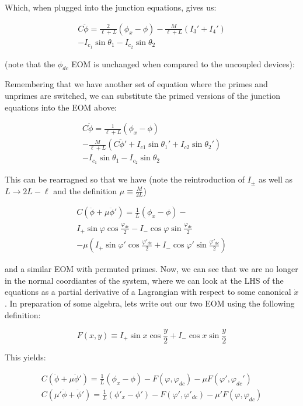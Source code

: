 \documentclass[paper=a4, twocolumn, fontsize=10pt]{article} %
\numberwithin{equation}{section} %
\numberwithin{figure}{section} %
\numberwithin{table}{section} %
\begin{document}
Which, when plugged into the junction equations, gives us:

\begin{multline}
    C \ddot{\phi} = \frac{2}{\ell+L}\left( \phi_x - \phi \right) - \frac{M}{\ell+L} (I_3'+I_4') \\ - I_{c_1} \sin \theta_1 - I_{c_2} \sin \theta_2
\end{multline}

(note that the $\phi_{dc}$ EOM is unchanged when compared to the uncoupled devices):

Remembering that we have another set of equation where the primes and unprimes are switched, we can substitute the primed versions of the junction equations into the EOM above:

\begin{multline}
    C \ddot{\phi} = \frac{1}{\ell+L}\left( \phi_x - \phi \right) \\ - \frac{M}{\ell+L} ( C\ddot{\phi}' + I_{c1}\sin \theta_1' + I_{c2} \sin \theta_2') \\ - I_{c_1} \sin \theta_1 - I_{c_2} \sin \theta_2
\end{multline}

This can be rearragned so that we have (note the reintroduction of $I_{\pm}$ as well as $L\to 2L-\ell$ and the definition $\mu\equiv \frac{M}{2L}$)

\begin{multline}
    C \left(\ddot{\phi}+ \mu \ddot{\phi}' \right) = \frac{1}{L}\left( \phi_x - \phi \right) -  \\
    I_{+} \sin \varphi \cos \frac{\varphi_{dc}}{2} - I_{-} \cos \varphi \sin \frac{\varphi_{dc}}{2} \\
    - \mu ( I_{+} \sin \varphi' \cos \frac{\varphi'_{dc}}{2} + I_{-} \cos \varphi' \sin \frac{\varphi'_{dc}}{2})
\end{multline}

and a similar EOM with permuted primes. Now, we can see that we are no longer in the normal coordiantes of the system, where we can look at the LHS of the equations as a partial derivative of a Lagrangian with respect to some canonical $\dot{x}$. In preparation of some algebra, lets write out our two EOM using the following definition:

\[ F(x,y) \equiv I_{+} \sin x \cos \frac{y}{2} + I_{-} \cos x \sin \frac{y}{2} \]

This yields:

\begin{align}
    C \left( \ddot{\phi} + \mu \ddot{\phi}'\right) = \frac{1}{L} (\phi_x-\phi) - F(\varphi, \varphi_{dc}) - \mu F(\varphi',\varphi_{dc}')
    \\
    C \left( \mu' \ddot{\phi} + \ddot{\phi}'\right) = \frac{1}{L} (\phi'_x-\phi') - F(\varphi', \varphi'_{dc}) - \mu' F(\varphi,\varphi_{dc})
\end{align}
\end{document}
